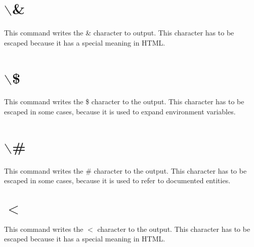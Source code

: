  \hypertarget{commands_cmdamp}{}\section{$\backslash$\&}\label{commands_cmdamp}
 This command writes the \& character to output. This character has to be escaped because it has a special meaning in HTML.



 \hypertarget{commands_cmddollar}{}\section{$\backslash$\$}\label{commands_cmddollar}
 This command writes the \$ character to the output. This character has to be escaped in some cases, because it is used to expand environment variables.



 \hypertarget{commands_cmdhash}{}\section{$\backslash$\#}\label{commands_cmdhash}
 This command writes the \# character to the output. This character has to be escaped in some cases, because it is used to refer to documented entities.



 \hypertarget{commands_cmdlt}{}\section{$<$}\label{commands_cmdlt}
 This command writes the $<$ character to the output. This character has to be escaped because it has a special meaning in HTML.



